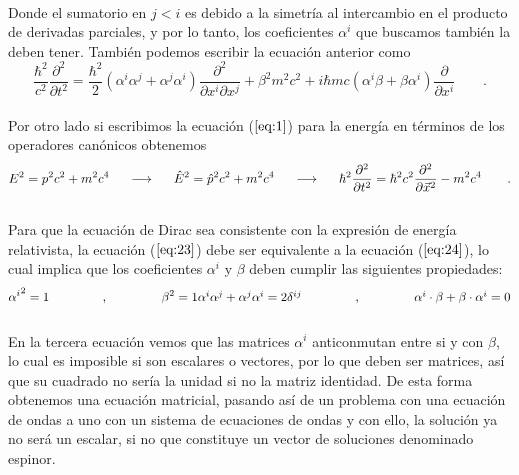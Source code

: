 \documentclass[11pt,letterpaper]{article}     %
\begin{document}
\\Donde el sumatorio en $j<i$ es debido a la simetría al intercambio en el producto de derivadas parciales, y por lo tanto, los coeficientes $\alpha^i$ que buscamos también la deben tener. También podemos escribir la ecuación anterior como
\begin{equation} \label{eq:23}
\frac{\hbar^2}{c^2} \frac{\partial^2}{\partial t^2} = \frac{\hbar^2}{2}(\alpha^i \alpha^j + \alpha^j \alpha^i) \frac{\partial^2}{\partial x^i \partial x^j} + \beta^2 m^2c^2 +  i\hbar mc(\alpha^i \beta + \beta  \alpha^i) \frac{\partial}{\partial x^i} \qquad .
\end{equation} 
\\Por otro lado si escribimos la ecuación ($\ref{eq:1}$) para la energía en términos de los operadores canónicos obtenemos
\begin{equation} \label{eq:24}
E^2 = p^2c^2 + m^2c^4 \hspace{5mm}\longrightarrow \hspace{5mm}\hat{E}^2 = \hat{p}^2c^2 + m^2 c^4 \hspace{5mm}\longrightarrow \hspace{5mm}\hbar^2 \frac{\partial^2}{\partial t^2}= \hbar^2 c^2\frac{\partial^2}{\partial \vec{x}^2} - m^2c^4 \qquad .
\end{equation}
\\Para que la ecuación de Dirac sea consistente con la expresión de energía relativista, la ecuación ($\ref{eq:23}$) debe ser equivalente a la ecuación ($\ref{eq:24}$), lo cual implica que los coeficientes $\alpha^i$ y $\beta$ deben cumplir las siguientes propiedades:
\begin{equation} \label{eq:25}
{\alpha^i}^2 = 1  \hspace{1.5cm}, \hspace{1.5cm} \beta^2 = 1 $$\\$$
\alpha^i \alpha^j + \alpha^j \alpha^i =2 \delta ^{ij}  \hspace{1.5cm}, \hspace{1.5cm} \alpha^i \cdot \beta + \beta \cdot \alpha^i = 0
\end{equation}
\\En la tercera ecuación vemos que las matrices $\alpha^i$ anticonmutan entre si y con $\beta$, lo cual es imposible si son escalares o vectores, por lo que deben ser matrices, así que su cuadrado no sería la unidad si no la matriz identidad. De esta forma obtenemos una ecuación matricial, pasando así de un problema con una ecuación de ondas a uno con un sistema de ecuaciones de ondas y con ello, la solución ya no será un escalar, si no que constituye un vector de soluciones denominado espinor.\\
\end{document}
